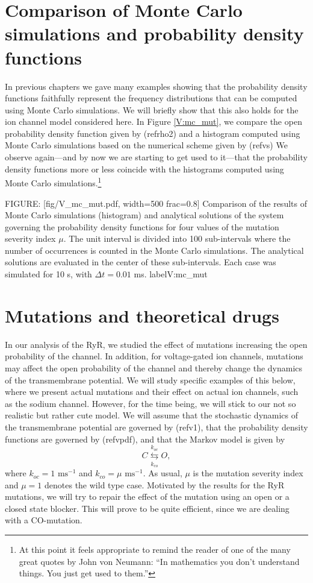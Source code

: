 \section[Comparison of MCs and PDFs]{Comparison of Monte Carlo simulations and probability density functions}


In previous chapters we gave many examples showing that the probability density
functions faithfully represent the frequency distributions that can be
computed using Monte Carlo simulations. We will briefly show that this also
holds for the ion channel model considered here. In Figure \ref{V:mc_mut}, we compare the
open probability density function given by (ref{rho2}) and a
histogram computed using Monte Carlo simulations based on the numerical scheme
given by (ref{vs})  We observe again---and by now we are starting to get used to it---that the probability density functions 
more or less coincide with the histograms computed using Monte Carlo simulations.\footnote{At this point
it feels appropriate to remind the reader of one of the many great quotes by John von Neumann: 
{``In mathematics you don't understand things. You just get used to them.''}
}

FIGURE: [fig/V_mc_mut.pdf, width=500 frac=0.8] Comparison of the results of Monte Carlo simulations (histogram) and 
analytical solutions of the system
governing the probability density functions for four values of the mutation severity 
index $\mu$. The unit interval is divided into 100 sub-intervals where the 
number of occurrences is counted in the Monte Carlo simulations. The analytical solutions are evaluated in the center of these sub-intervals. Each case was simulated for 10 s, with $\Delta t=0.01$ ms. label{V:mc_mut}
\section{Mutations and theoretical drugs}

In our analysis of the RyR, we studied the effect of mutations increasing the 
open probability of the channel. In addition, for voltage-gated ion
channels, mutations may affect the open probability of the channel and thereby
change the dynamics of the transmembrane potential. We will study specific
examples of this below, where we present actual mutations and their effect on
actual ion channels, such as the sodium channel. However, for the time being,
we will stick to our not so realistic but rather cute model. We will assume 
that the stochastic dynamics of the transmembrane potential are governed by 
(ref{v1}),  that the probability density functions are governed by
(ref{vpdf}), and that the Markov model is given by
\begin{equation}
C\underset{k_{co}}{\overset{k_{oc}}{\leftrightarrows}}O,
\end{equation}
where $k_{oc}=1 \text{ ms}^{-1}$ and $k_{co}=\mu\text{ ms}^{-1}.$ 
As usual,  $\mu$ is the mutation severity
index and $\mu=1$ denotes the wild type case. 
Motivated by the results for the RyR mutations,
we will try to repair the effect of the mutation using an open or a closed
state blocker. This will prove to be quite efficient, since we are dealing with a CO-mutation.

